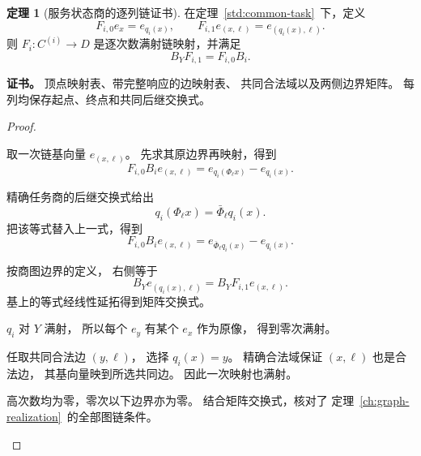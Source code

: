 \documentclass[UTF8,12pt,a4paper,openany,fontset=none,zihao=false]{ctexrep}
\theoremstyle{definition}
\newtheorem{theorem}{定理}[chapter]
\newenvironment{certificate}{\par\noindent\textbf{证书。}\ignorespaces}{\par}
\newcommand{\1}{\mathbf 1}
\begin{document}
\begin{theorem}[服务状态商的逐列链证书]
\label{std:graph-map}
在定理~\ref{std:common-task}~下，定义
\[
F_{i,0}e_x=e_{q_i(x)},\qquad
F_{i,1}e_{(x,\ell)}=e_{(q_i(x),\ell)}.
\]
则 \(F_i:C^{(i)}\to D\) 是逐次数满射链映射，并满足
\[
B_YF_{i,1}=F_{i,0}B_i.
\]
\end{theorem}
\begin{certificate}
顶点映射表、带完整响应的边映射表、
共同合法域以及两侧边界矩阵。
每列均保存起点、终点和共同后继交换式。
\end{certificate}
\begin{proof}
\begin{semanticsteps}
\item 取一次链基向量 \(e_{(x,\ell)}\)。
先求其原边界再映射，得到
\[
F_{i,0}B_ie_{(x,\ell)}
=e_{q_i(\Phi_\ell x)}-e_{q_i(x)}.
\]
\item 精确任务商的后继交换式给出
\[
q_i(\Phi_\ell x)=\bar\Phi_\ell q_i(x).
\]
把该等式替入上一式，得到
\[
F_{i,0}B_ie_{(x,\ell)}
=e_{\bar\Phi_\ell q_i(x)}-e_{q_i(x)}.
\]
\item 按商图边界的定义，
右侧等于
\[
B_Ye_{(q_i(x),\ell)}
=B_YF_{i,1}e_{(x,\ell)}.
\]
基上的等式经线性延拓得到矩阵交换式。
\item \(q_i\) 对 \(Y\) 满射，
所以每个 \(e_y\) 有某个 \(e_x\) 作为原像，
得到零次满射。
\item 任取共同合法边 \((y,\ell)\)，
选择 \(q_i(x)=y\)。
精确合法域保证 \((x,\ell)\) 也是合法边，
其基向量映到所选共同边。
因此一次映射也满射。
\item 高次数均为零，零次以下边界亦为零。
结合矩阵交换式，核对了
定理~\ref{ch:graph-realization}~的全部图链条件。
\end{semanticsteps}
\end{proof}
\end{document}
